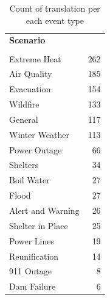 \begin{table}
\centering
\begin{tabular}{lr}
\toprule
\textbf{Scenario} & \textbf{Count \\} \\
\midrule
Extreme Heat & 262 \\
Air Quality & 185 \\
Evacuation & 154 \\
Wildfire & 133 \\
General & 117 \\
Winter Weather & 113 \\
Power Outage & 66 \\
Shelters & 34 \\
Boil Water & 27 \\
Flood & 27 \\
Alert and Warning & 26 \\
Shelter in Place & 25 \\
Power Lines & 19 \\
Reunification & 14 \\
911 Outage & 8 \\
Dam Failure & 6 \\
\bottomrule
\end{tabular}
\caption{Count of translation per each event type}
\label{tab:domain_counts_portland}

\end{table}